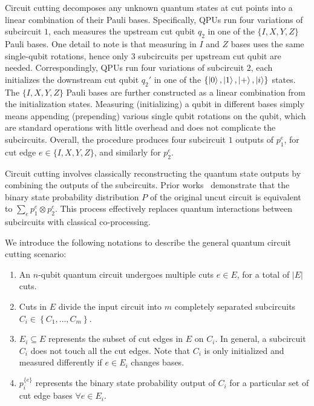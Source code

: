 Circuit cutting decomposes any unknown quantum states at cut points into a linear combination of their Pauli bases.
Specifically, QPUs run four variations of subcircuit $1$, each measures the upstream cut qubit $q_2$ in one of the $\{I,X,Y,Z\}$ Pauli bases.
One detail to note is that measuring in $I$ and $Z$ bases uses the same single-qubit rotations,
hence only $3$ subcircuits per upstream cut qubit are needed.
Correspondingly, QPUs run four variations of subcircuit $2$,
each initializes the downstream cut qubit $q_2'$ in one of the $\{\ket{0},\ket{1},\ket{+},\ket{i}\}$ states.
The $\{I,X,Y,Z\}$ Pauli bases are further constructed as a linear combination from the initialization states.
Measuring (initializing) a qubit in different bases simply means appending (prepending) various single qubit rotations on the qubit,
which are standard operations with little overhead and does not complicate the subcircuits.
Overall, the procedure produces four subcircuit $1$ outputs of $p_1^e$, for cut edge $e\in\{I,X,Y,Z\}$,
and similarly for $p_2^e$.

Circuit cutting involves classically reconstructing the quantum state outputs by combining the outputs of the subcircuits.
Prior works~\cite{peng2020simulating,tang2021cutqc} demonstrate that the binary state probability distribution $P$ of the original uncut circuit is equivalent to $\sum_{e}p_1^e\otimes p_2^e$.
This process effectively replaces quantum interactions between subcircuits with classical co-processing.

We introduce the following notations to describe the general quantum circuit cutting scenario:
\begin{enumerate}
    \item An $n$-qubit quantum circuit undergoes multiple cuts $e\in E$,
    for a total of $|E|$ cuts.
    \item Cuts in $E$ divide the input circuit into $m$ completely separated subcircuits $C_i\in\left\{C_1,\ldots,C_{m}\right\}$.
    \item $E_i\subseteq E$ represents the subset of cut edges in $E$ on $C_i$.
    In general, a subcircuit $C_i$ does not touch all the cut edges.
    Note that $C_i$ is only initialized and measured differently if $e\in E_i$ changes bases.
    \item $p_i^{\{e\}}$ represents the binary state probability output of $C_i$ for a particular set of cut edge bases $\forall e\in E_i$.
\end{enumerate}

